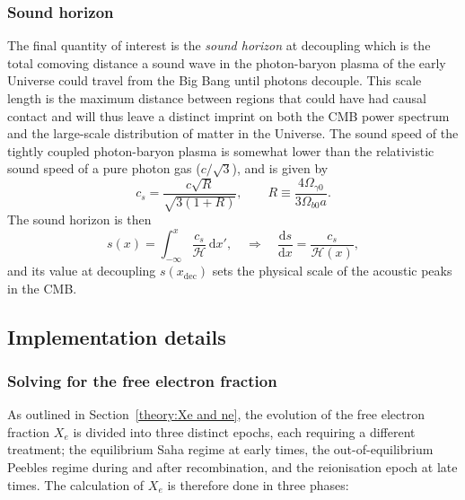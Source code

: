 \documentclass[twocolumn]{aa}
\renewcommand{\d}{\text{d}}
\newcommand{\dd}[2]{\frac{\d #1}{\d #2}}
\begin{document}
\subsubsection{Sound horizon}
The final quantity of interest is the \textit{sound horizon} at decoupling which is the total comoving distance a sound wave in the photon-baryon plasma of the early Universe could travel from the Big Bang until photons decouple. This scale length is the maximum distance between regions that could have had causal contact and will thus leave a distinct imprint on both the CMB power spectrum and the large-scale distribution of matter in the Universe. The sound speed of the tightly coupled photon-baryon plasma is somewhat lower than the relativistic sound speed of a pure photon gas ($c/\sqrt{3}$), and is given by
\begin{equation*}
    c_s = \frac{c\sqrt{R}}{\sqrt{3(1+R)}}, \qquad R \equiv \frac{4\Omega_{\gamma 0}}{3\Omega_{b0}a}.
\end{equation*}
The sound horizon is then
\begin{equation}
    s(x) = \int_{-\infty}^{x} \frac{c_s}{\mathcal{H}} \, \mathrm{d}x',\quad\Rightarrow\quad \dd{s}{x} = \frac{c_s}{\mathcal{H}(x)}, \label{eq:sound horizon}
\end{equation}
and its value at decoupling $s(x_\text{dec})$ sets the physical scale of the acoustic peaks in the CMB.

\subsection{Implementation details}
\subsubsection{Solving for the free electron fraction}
As outlined in Section~\ref{theory:Xe and ne}, the evolution of the free electron fraction $X_e$ is divided into three distinct epochs, each requiring a different treatment; the equilibrium Saha regime at early times, the out-of-equilibrium Peebles regime during and after recombination, and the reionisation epoch at late times. The calculation of $X_e$ is therefore done in three phases:
\end{document}

